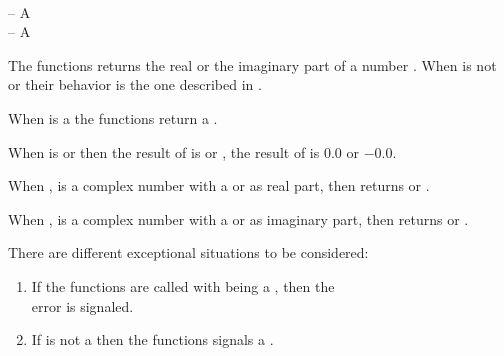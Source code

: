 \documentclass[../Type-Manipulation-Coercion.tex]{subfiles}
\begin{document}

\DSyntax{}

  \RArrow {}\\
  \RArrow {}

\DArgsNValues{}

 -- A \\
 -- A 

\DDescription{}

The functions returns the real or the imaginary part of a number .
When  is not  or 
their behavior is the one described in \cite{1996:ANSIHyperSpec}.

\noindent
When  is a  the functions return a
.

\noindent
When  is  or
 then the result of
 is  or , the
result of  is $0.0$ or $-0.0$.

\noindent
When , is a complex number with a  or
 as real part, then  returns
 or .

\noindent
When , is a complex number with a  or
 as imaginary part, then  returns
 or .

\DExceptional{}

There are different exceptional situations to be considered:
\begin{enumerate}
\item If the functions are called with
   being a
  , then the\\
   error is signaled.
\item If  is not a \CL{}  then the functions
  signals a .
\end{enumerate}
\end{document}
